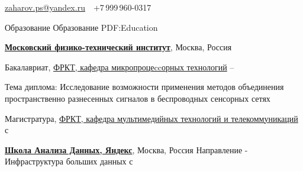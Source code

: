 \documentclass[a4paper, MMyyyy,nonstopmode]{simpleresumecv}
\newcommand{\CVAuthor}{Павел Захаров}
\begin{document}

\Title{\CVAuthor}

\begin{SubTitle}
\href{paltoszaharov@yandex.ru}
{zaharov.ps@yandex.ru}
\,\SubBulletSymbol\,
+7\,999\,960-0317
\end{SubTitle}

\begin{Body}


\Section
{Образование}
{Образование}
{PDF:Education}

\Entry
\href{https://mipt.ru/}
{\textbf{Московский физико-технический институт}},
Москва, Россия

\Gap
\BulletItem
Бакалавриат, 
\href{https://mipt.ru/education/chairs/microprocessors/}
{ФРКТ, кафедра микропроцеccорных технологий}
\hfill
{} --
\begin{Detail}
\SubBulletItem
Тема диплома: Исследование возможности применения методов
объединения пространственно разнесенных сигналов
в беспроводных сенсорных сетях
\end{Detail}

\BulletItem
Магистратура, 
\href{https://mipt.ru/drec/about/bases/multimedia_technology_and_telecommunications/}
{ФРКТ, кафедра мультимедийных технологий и телекоммуникаций}
\hfill
с 

\Gap

\Entry
\href{https://yandexdataschool.ru/}
{\textbf{Школа Анализа Данных, Яндекс}},
Москва, Россия
\Gap
\BulletItem
Направление - Инфраструктура больших данных
\hfill
с 
%


\end{Body}
\end{document}
